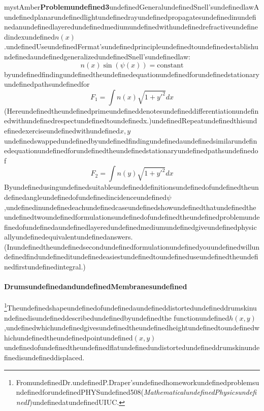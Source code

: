 \begin{mystadmonition}{mystAmber}{\textbf{Problemundefined3}undefinedGeneralundefinedSnell'sundefinedlaw}Aundefinedplanarundefinedlightundefinedrayundefinedpropagatesundefinedinundefinedanundefinedlayeredundefinedmediumundefinedwithundefinedrefractiveundefinedindexundefined$n(x)$.undefinedUseundefinedFermat'sundefinedprincipleundefinedtoundefinedestablishundefinedaundefinedgeneralizedundefinedSnell'sundefinedlaw:
\begin{equation}
n(x)\sin(\psi(x))=\text{constant}
\end{equation}
byundefinedfindingundefinedtheundefinedequationundefinedforundefinedstationaryundefinedpathsundefinedfor
\begin{equation}
F_1=\int n(x)\sqrt{1+y'^2}dx
\end{equation}
(Hereundefinedtheundefinedprimeundefineddenotesundefineddifferentiationundefinedwithundefinedrespectundefinedtoundefinedx.)undefinedRepeatundefinedthisundefinedexerciseundefinedwithundefined$x,y$undefinedswappedundefinedbyundefinedfindingundefinedaundefinedsimilarundefinedequationundefinedforundefinedtheundefinedstationaryundefinedpathsundefinedof
\begin{equation}
F_2=\int n(y)\sqrt{1+y'^2}dx
\end{equation}
Byundefinedusingundefinedsuitableundefineddefinitionsundefinedofundefinedtheundefinedangleundefinedofundefinedincidenceundefined$\psi$,undefinedinundefinedeachundefinedcaseundefinedshowundefinedthatundefinedtheundefinedtwoundefinedformulationsundefinedofundefinedtheundefinedproblemundefinedofundefinedaundefinedlayeredundefinedmediumundefinedgiveundefinedphysicallyundefinedequivalentundefinedanswers.
(Inundefinedtheundefinedsecondundefinedformulationundefinedyouundefinedwillundefinedfindundefineditundefinedeasiestundefinedtoundefineduseundefinedtheundefinedfirstundefinedintegral.)

\end{mystadmonition}
\paragraph{DrumsundefinedandundefinedMembranesundefined}

\footnote{FromundefinedDr.undefinedP.Draper'sundefinedhomeworkundefinedproblemsundefinedforundefinedPHYSundefined508(\textit{MathematicalundefinedPhysicsundefinedI})undefinedatundefinedUIUC.}Theundefinedshapeundefinedofundefinedaundefineddistortedundefineddrumskinundefinedisundefineddescribedundefinedbyundefinedthe
functionundefined$h(x, y)$,undefinedwhichundefinedgivesundefinedtheundefinedheightundefinedtoundefinedwhichundefinedtheundefinedpointundefined$(x, y)$undefinedofundefinedtheundefinedflatundefinedundistortedundefineddrumskinundefinedisundefineddisplaced.

